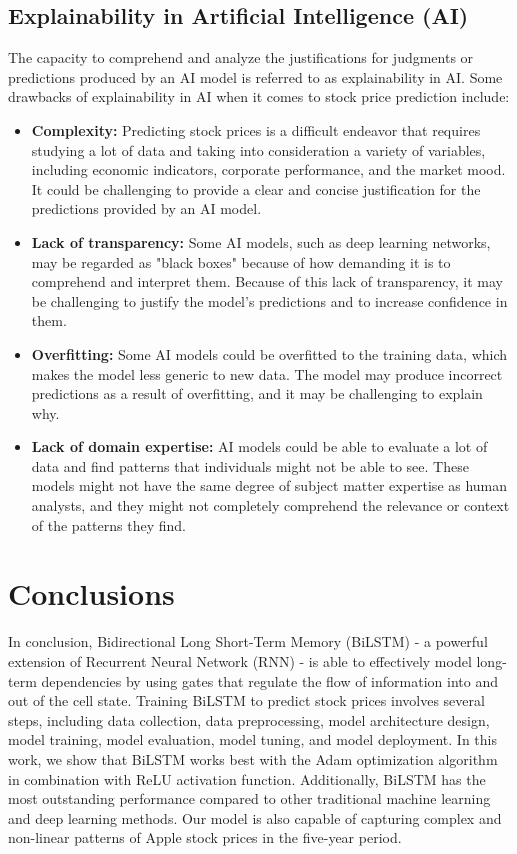 \documentclass[a4paper]{article}
\begin{document}
\subsection{Explainability in Artificial Intelligence (AI)}
The capacity to comprehend and analyze the justifications for judgments or predictions produced by an AI model is referred to as explainability in AI. Some drawbacks of explainability in AI when it comes to stock price prediction include:
\begin{itemize}[leftmargin=7.5pt]
    \item \textbf{Complexity:} Predicting stock prices is a difficult endeavor that requires studying a lot of data and taking into consideration a variety of variables, including economic indicators, corporate performance, and the market mood. It could be challenging to provide a clear and concise justification for the predictions provided by an AI model.
    \item \textbf{Lack of transparency:} Some AI models, such as deep learning networks, may be regarded as "black boxes" because of how demanding it is to comprehend and interpret them. Because of this lack of transparency, it may be challenging to justify the model's predictions and to increase confidence in them.
    \item \textbf{Overfitting:} Some AI models could be overfitted to the training data, which makes the model less generic to new data. The model may produce incorrect predictions as a result of overfitting, and it may be challenging to explain why.
    \item \textbf{Lack of domain expertise:} AI models could be able to evaluate a lot of data and find patterns that individuals might not be able to see. These models might not have the same degree of subject matter expertise as human analysts, and they might not completely comprehend the relevance or context of the patterns they find.
\end{itemize}
\section{Conclusions}
In conclusion, Bidirectional Long Short-Term Memory (BiLSTM) - a powerful extension of Recurrent Neural Network (RNN) - is able to effectively model long-term dependencies by using gates that regulate the flow of information into and out of the cell state. Training BiLSTM to predict stock prices involves several steps, including data collection, data preprocessing, model architecture design, model training, model evaluation, model tuning, and model deployment. In this work, we show that BiLSTM works best with the Adam optimization algorithm in combination with ReLU activation function. Additionally, BiLSTM has the most outstanding performance compared to other traditional machine learning and deep learning methods. Our model is also capable of capturing complex and non-linear patterns of Apple stock prices in the five-year period.
\vfill
\pagebreak
\nocite{*}


\end{document}
